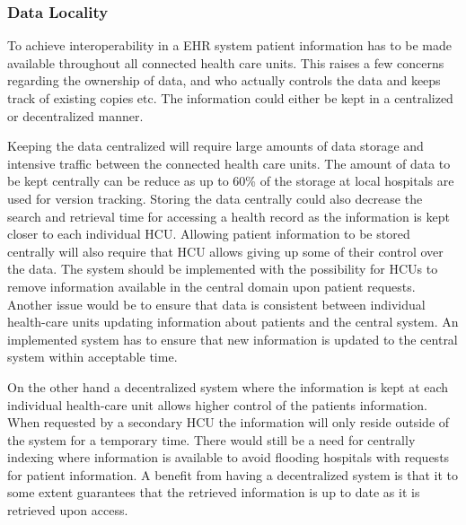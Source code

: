 \documentclass[14pt]{article}
\begin{document}
\subsubsection{Data Locality}




To achieve interoperability in a \gls{EHR} system patient information has to be made available throughout all connected health care units. This raises a few concerns regarding the ownership of data, and who actually controls the data and keeps track of existing copies etc. The information could either be kept in a centralized or decentralized manner.

Keeping the data centralized will require large amounts of data storage and intensive traffic between the connected health care units. The amount of data to be kept centrally can be reduce as up to 60\% of the storage at local hospitals are used for version tracking. Storing the data centrally could also decrease the search and retrieval time for accessing a health record as the information is kept closer to each individual \gls{HCU}.
Allowing patient information to be stored centrally will also require that \gls{HCU} allows giving up some of their control over the data. The system should be implemented with the possibility for \glspl{HCU} to remove information available in the central domain upon patient requests. Another issue would be to ensure that data is consistent between individual health-care units updating information about patients and the central system. An implemented system has to ensure that new information is updated to the central system within acceptable time.

On the other hand a decentralized system where the information is kept at each individual health-care unit allows higher control of the patients information. When requested by a secondary \gls{HCU} the information will only reside outside of the system for a temporary time. There would still be a need for centrally indexing where information is available to avoid flooding hospitals with requests for patient information. A benefit from having a decentralized system is that it to some extent guarantees that the retrieved information is up to date as it is retrieved upon access.
\end{document}
